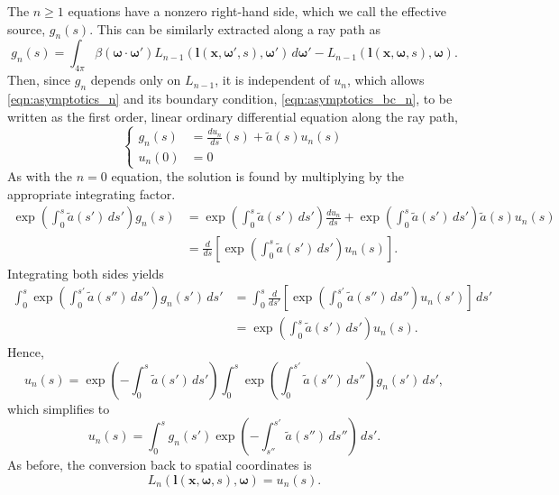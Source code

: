 \documentclass[ms,cpyr,lof,lot]{uathesis}
\renewcommand\vec\bm
\begin{document}
The $n \geq 1$ equations have a nonzero right-hand side, which we call the effective source, $g_n(s)$.
This can be similarly extracted along a ray path as
\begin{equation*}
  g_n(s) = \int_{4\pi} \beta(\vec{\omega}\cdot\vec{\omega}')
  L_{n-1}(\vec{l}(\vec{x}, \vec{\omega'}, s), \vec{\omega}')\,d\vec{\omega}' - L_{n-1}(\vec{l}(\vec{x}, \vec{\omega}, s), \vec{\omega}).
\end{equation*}
Then, since $g_n$ depends only on $L_{n-1}$, it is independent of $u_n$, which allows \eqref{eqn:asymptotics_n} and its boundary condition, \eqref{eqn:asymptotics_bc_n}, to be written as the first order, linear ordinary differential equation along the ray path,
\begin{equation*}
  \left\{
  \begin{aligned}
    g_n(s) &= \frac{du_n}{ds}(s) + \tilde{a}(s)u_n(s) \\
    u_n(0) &= 0
  \end{aligned}
  \right.
\end{equation*}
As with the $n=0$ equation, the solution is found by multiplying by the appropriate integrating factor.
\begin{align*}
  \exp\left(\int_0^s \tilde{a}(s')\, ds'\right) g_n(s) &= \exp\left(\int_0^s \tilde{a}(s')\, ds'\right) \frac{du_n}{ds} + \exp\left(\int_0^s \tilde{a}(s')\, ds'\right) \tilde{a}(s) u_n(s) \\
  &= \frac{d}{ds}\left[\exp\left(\int_0^s \tilde{a}(s')\, ds'\right) u_n(s)\right].
\end{align*}
Integrating both sides yields
\begin{align*}
  \int_0^s\exp\left(\int_0^{s'} \tilde{a}(s'')\, ds''\right) g_n(s')\, ds' &= \int_0^s \frac{d}{ds'}\left[\exp\left(\int_0^{s'} \tilde{a}(s'')\, ds''\right) u_n(s')\right]\, ds' \\
  &= \exp\left(\int_0^s \tilde{a}(s')\, ds'\right) u_n(s).
\end{align*}
Hence,
\begin{equation*}
  u_n(s) = \exp\left(-\int_0^s \tilde{a}(s')\, ds'\right) \int_0^s\exp\left(\int_0^{s'} \tilde{a}(s'')\, ds''\right) g_n(s')\, ds',
\end{equation*}
which simplifies to
\begin{equation}
  u_n(s) = \int_0^sg_n(s')\exp\left( -\int_{s''}^{s'}\tilde{a}(s'')\,ds'' \right)\, ds'.
  \label{eqn:asymptotics_soln_n}
\end{equation}
As before, the conversion back to spatial coordinates is
\begin{equation*}
  L_n(\vec{l}(\vec{x}, \vec{\omega}, s), \vec{\omega}) = u_n(s).
\end{equation*}
\end{document}
